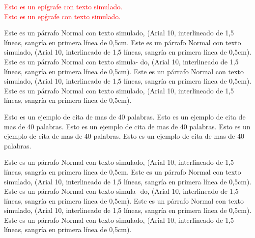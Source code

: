 

\begin{epigrafe}
  \textcolor{red}{Esto es  un ep\'igrafe con  texto simulado.\\ Esto es  un ep\'grafe
    con  texto simulado.
}
\end{epigrafe}

\label{s:5.1}

Este es un  p\'arrafo Normal con texto simulado, (Arial  10, interlineado de 1,5
l\'ineas, sangr\'ia en primera l\'inea de 0,5cm. Este es un p\'arrafo Normal con
texto simulado,  (Arial 10, interlineado  de 1,5 l\'ineas, sangr\'ia  en primera
l\'inea de 0,5cm). Este es un  p\'arrafo Normal con texto simula- do, (Arial 10,
interlineado de 1,5 l\'ineas, sangr\'ia en primera l\'inea de 0,5cm). Este es un
p\'arrafo Normal  con texto simulado,  (Arial 10, interlineado de  1,5 l\'ineas,
sangr\'ia en primera  l\'inea de 0,5cm).  Este es un  p\'arrafo Normal con texto
simulado, (Arial 10, interlineado de  1,5 l\'ineas, sangr\'ia en primera l\'inea
de 0,5cm).

\begin{citas}
  {\color{red} Esto  es un ejemplo  de cita  de mas de  40 palabras. Esto  es un
    ejemplo de cita de mas de 40 palabras.  Esto es un ejemplo de cita de mas de
    40 palabras. Esto  es un ejemplo de cita  de mas de 40 palabras.  Esto es un
    ejemplo de cita de mas de 40 palabras.}
\end{citas}

Este es un  p\'arrafo Normal con texto simulado, (Arial  10, interlineado de 1,5
l\'ineas, sangr\'ia en primera l\'inea de 0,5cm. Este es un p\'arrafo Normal con
texto simulado,  (Arial 10, interlineado  de 1,5 l\'ineas, sangr\'ia  en primera
l\'inea de 0,5cm). Este es un  p\'arrafo Normal con texto simula- do, (Arial 10,
interlineado de 1,5 l\'ineas, sangr\'ia en primera l\'inea de 0,5cm). Este es un
p\'arrafo Normal  con texto simulado,  (Arial 10, interlineado de  1,5 l\'ineas,
sangr\'ia en  primera l\'inea de 0,5cm).  Este es un p\'arrafo  Normal con texto
simulado, (Arial 10, interlineado de  1,5 l\'ineas, sangr\'ia en primera l\'inea
de 0,5cm).


